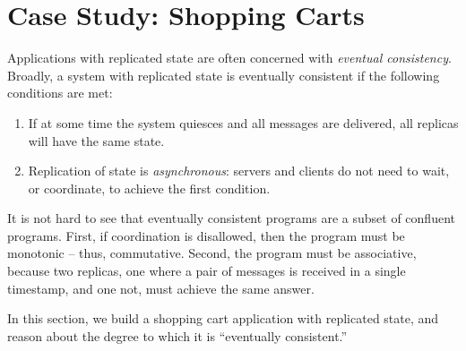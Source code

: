 \section{Case Study: Shopping Carts}
Applications with replicated state are often concerned with {\em eventual
consistency}.  Broadly, a system with replicated state is eventually consistent
if the following conditions are met:

\begin{enumerate}
%
\item If at some time the system quiesces and all messages are delivered, all
replicas will have the same state.
%
\item Replication of state is \emph{asynchronous}: servers and clients do not
need to wait, or coordinate, to achieve the first condition.
%
\end{enumerate}

It is not hard to see that eventually consistent programs are a subset of
confluent programs.  First, if coordination is disallowed, then the program
must be monotonic -- thus, commutative.  Second, the program must be
associative, because two replicas, one where a pair of messages is received in
a single timestamp, and one not, must achieve the same answer.

In this section, we build a shopping cart application with replicated state,
and reason about the degree to which it is ``eventually consistent.''

%
%
%

